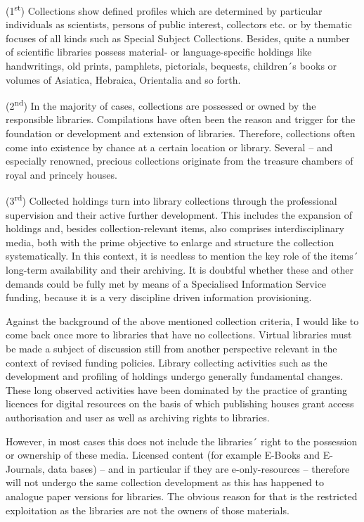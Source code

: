 \documentclass[a4paper,
fontsize=11pt,
oneside,
numbers=noperiodatend,
parskip=half-,
bibliography=totoc,
final
]{scrartcl}
\begin{document}
(1\textsuperscript{st}) Collections show defined profiles which are
determined by particular individuals as scientists, persons of public
interest, collectors etc. or by thematic focuses of all kinds such as
Special Subject Collections. Besides, quite a number of scientific
libraries possess material- or language-specific holdings like
handwritings, old prints, pamphlets, pictorials, bequests, children´s
books or volumes of Asiatica, Hebraica, Orientalia and so forth.

(2\textsuperscript{nd}) In the majority of cases, collections are
possessed or owned by the responsible libraries. Compilations have often
been the reason and trigger for the foundation or development and
extension of libraries. Therefore, collections often come into existence
by chance at a certain location or library. Several -- and especially
renowned, precious collections originate from the treasure chambers of
royal and princely houses.

(3\textsuperscript{rd}) Collected holdings turn into library collections
through the professional supervision and their active further
development. This includes the expansion of holdings and, besides
collection-relevant items, also comprises interdisciplinary media, both
with the prime objective to enlarge and structure the collection
systematically. In this context, it is needless to mention the key role
of the items´ long-term availability and their archiving. It is doubtful
whether these and other demands could be fully met by means of a
Specialised Information Service funding, because it is a very discipline
driven information provisioning.

Against the background of the above mentioned collection criteria, I
would like to come back once more to libraries that have no collections.
Virtual libraries must be made a subject of discussion still from
another perspective relevant in the context of revised funding policies.
Library collecting activities such as the development and profiling of
holdings undergo generally fundamental changes. These long observed
activities have been dominated by the practice of granting licences for
digital resources on the basis of which publishing houses grant access
authorisation and user as well as archiving rights to libraries.

However, in most cases this does not include the libraries´ right to the
possession or ownership of these media. Licensed content (for example
E-Books and E-Journals, data bases) -- and in particular if they are
e-only-resources -- therefore will not undergo the same collection
development as this has happened to analogue paper versions for
libraries. The obvious reason for that is the restricted exploitation as
the libraries are not the owners of those materials.
\end{document}
